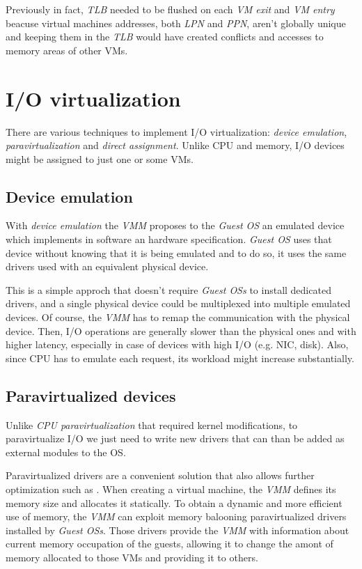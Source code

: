 Previously in fact, \emph{TLB} needed to be flushed on each \emph{VM exit} and
\emph{VM entry} beacuse virtual machines addresses, both \emph{LPN} and \emph{PPN},
aren't globally unique and keeping them in the \emph{TLB} would have created
conflicts and accesses to memory areas of other VMs.

\section{I/O virtualization}
There are various techniques to implement I/O virtualization: \emph{device
emulation}, \emph{paravirtualization} and \emph{direct assignment}. Unlike CPU and
memory, I/O devices might be assigned to just one or some VMs.

\subsection{Device emulation}
With \emph{device emulation} the \emph{VMM} proposes to the \emph{Guest OS} an
emulated device which implements in software an hardware specification.
\emph{Guest OS} uses that device without knowing that it is being emulated and
to do so, it uses the same drivers used with an equivalent physical device.

This is a simple approch that doesn't require \emph{Guest OSs} to install
dedicated drivers, and a single physical device could be multiplexed into
multiple emulated devices. Of course, the \emph{VMM} has to remap the communication
with the physical device. Then, I/O operations are generally slower than the
physical ones and with higher latency, especially in case of devices with high
I/O (e.g. NIC, disk). Also, since CPU has to emulate each request, its workload
might increase substantially.

\subsection{Paravirtualized devices}
Unlike \emph{CPU paravirtualization} that required kernel modifications, to
paravirtualize I/O we just need to write new drivers that can than be added as
external modules to the OS.

Paravirtualized drivers are a convenient solution that also allows further
optimization such as . When creating a virtual machine, the
\emph{VMM} defines its memory size and allocates it statically. To obtain a
dynamic and more efficient use of memory, the \emph{VMM} can exploit memory
balooning paravirtualized drivers installed by \emph{Guest OSs}. Those drivers
provide the \emph{VMM} with information about current memory occupation of the
guests, allowing it to change the amont of memory allocated to those VMs and
providing it to others.

